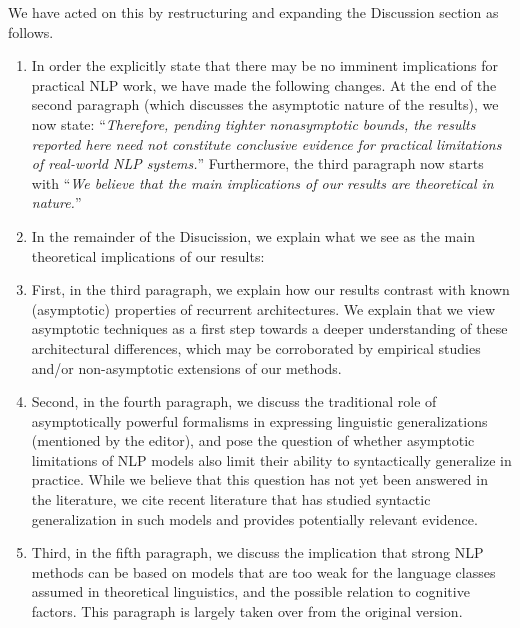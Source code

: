 \documentclass[11pt,a4paper]{article}
\newcommand\response[1]{{\color{blue}#1}}
\newcommand\newtext[1]{``\textit{#1}''}
\begin{document}
\response{We have acted on this by restructuring and expanding the Discussion section as follows.}
\begin{enumerate}
\item \response{In order the explicitly state that there may be no imminent implications for practical NLP work, we have made the following changes. At the end of the second paragraph (which discusses the asymptotic nature of the results), we now state: \newtext{Therefore, pending tighter nonasymptotic bounds, the results reported here need not constitute conclusive evidence for practical limitations of real-world NLP systems.} Furthermore, the third paragraph now starts with \newtext{We  believe  that  the  main  implications  of  our results  are  theoretical  in  nature.}}

\item \response{In the remainder of the Disucission, we explain what we see as the main theoretical implications of our results:}

\item \response{First, in the third paragraph, we explain how our results contrast with known (asymptotic) properties of recurrent architectures. We explain that we view asymptotic techniques as a first step towards a deeper understanding of these architectural differences, which may be corroborated by empirical studies and/or non-asymptotic extensions of our methods.}

\item \response{Second, in the fourth paragraph, we discuss the traditional role of asymptotically powerful formalisms in expressing linguistic generalizations (mentioned by the editor), and pose the question of whether asymptotic limitations of NLP models also limit their ability to syntactically generalize in practice. While we believe that this question has not yet been answered in the literature, we cite recent literature that has studied syntactic generalization in such models and provides potentially relevant evidence.}

\item \response{Third, in the fifth paragraph, we discuss the implication that strong NLP methods can be based on models that are too weak for the language classes assumed in theoretical linguistics, and the possible relation to cognitive factors. This paragraph is largely taken over from the original version.}

\end{enumerate}
\end{document}
